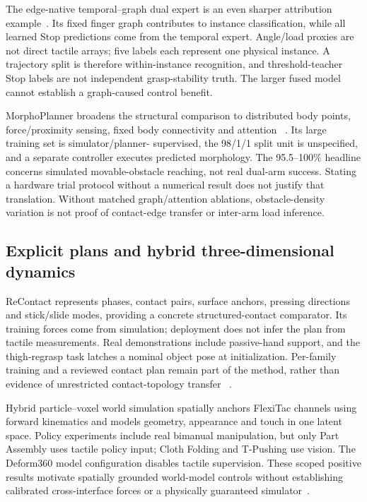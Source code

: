 The edge-native temporal--graph dual expert is an even sharper attribution
example~\cite{zheng2026edgenative}. Its fixed finger graph contributes to instance
classification, while all learned Stop predictions come from the temporal expert.
Angle/load proxies are not direct tactile arrays; five labels each represent one
physical instance. A trajectory split is therefore within-instance recognition,
and threshold-teacher Stop labels are not independent grasp-stability truth.
The larger fused model cannot establish a graph-caused control benefit.

MorphoPlanner broadens the structural comparison to distributed body points,
force/proximity sensing, fixed body connectivity and attention
~\cite{wang2026morphoplanner}. Its large training set is simulator/planner-
supervised, the 98/1/1 split unit is unspecified, and a separate controller
executes predicted morphology. The 95.5--100\% headline concerns simulated
movable-obstacle reaching, not real dual-arm success. Stating a hardware trial
protocol without a numerical result does not justify that translation. Without
matched graph/attention ablations, obstacle-density variation is not proof of
contact-edge transfer or inter-arm load inference.

\subsection{Explicit plans and hybrid three-dimensional dynamics}

ReContact represents phases, contact pairs, surface anchors, pressing directions
and stick/slide modes, providing a concrete structured-contact comparator.
Its training forces come from simulation; deployment does not infer the plan
from tactile measurements. Real demonstrations include passive-hand support,
and the thigh-regrasp task latches a nominal object pose at initialization.
Per-family training and a reviewed contact plan remain part of the method,
rather than evidence of unrestricted contact-topology transfer
~\cite{nov2026recontact}.

Hybrid particle--voxel world simulation spatially anchors FlexiTac channels using
forward kinematics and models geometry, appearance and touch in one latent
space. Policy experiments include real bimanual manipulation, but only Part
Assembly uses tactile policy input; Cloth Folding and T-Pushing use vision.
The Deform360 model configuration disables tactile supervision. These scoped
positive results motivate spatially grounded world-model controls without
establishing calibrated cross-interface forces or a physically guaranteed
simulator~\cite{nov20263dworldsimulator}.

